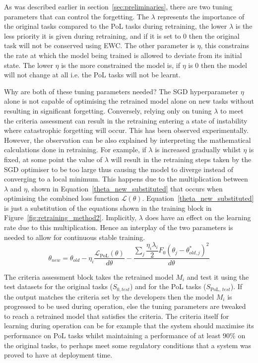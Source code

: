 As was described earlier in section~\ref{sec:preliminaries}, there are two tuning parameters that can control the forgetting. 
%
The $\lambda$ represents the importance of the original tasks compared to the PoL tasks during retraining, the lower $\lambda$ is the less priority it is given during retraining, and if it is set to 0 then the original task will not be conserved using EWC. 
%
The other parameter is $\eta$, this constrains the rate at which the model being trained is allowed to deviate from its initial state. 
%
The lower $\eta$ is the more constrained the model is, if $\eta$ is 0 then the model will not change at all i.e. the PoL tasks will not be learnt.

Why are both of these tuning parameters needed? 
%
The SGD hyperparameter $\eta$ alone is not capable of optimising the retrained model alone on new tasks without resulting in significant forgetting. 
%
Conversely, relying only on tuning $\lambda$ to meet the criteria assessment can result in the retraining entering a state of instability where catastrophic forgetting will occur. 
%
This has been observed experimentally. However, the observation can be also explained by interpreting the mathematical calculations done in retraining. 
%
For example, if $\lambda$ is increased gradually whilst $\eta$ is fixed, at some point the value of $\lambda$ will result in the retraining steps taken by the SGD optimiser to be too large thus causing the model to diverge instead of converging to a local minimum. 
%
This happens due to the multiplication between $\lambda$ and $\eta$, shown in Equation~\ref{theta_new_substituted} that occurs when optimising the combined loss function $\mathcal{L}(\theta)$.
%
Equation~\ref{theta_new_substituted} is just a substitution of the equations shown in the training block in Figure~\ref{fig:retraining_method2}. 
%
Implicitly, $\lambda$ does have an effect on the learning rate due to this multiplication.
Hence an interplay of the two parameters is needed to allow for continuous stable training. 
\begin{equation}
   \theta_{new} = \theta_{old} - \eta_{i}\dfrac{\mathcal{L}_{\text{PoL}}(\theta)}{d\theta} - 
   \dfrac{\sum_{j}^{}\dfrac{\eta_i\lambda_i}{2} F_0(\theta_j - \theta^{*}_{old,j})^2}{d\theta}
   \label{theta_new_substituted}
\end{equation}

The criteria assessment block takes the retrained model $M_i$ and test it using the test datasets for the original tasks ($S_{0,test}$) and for the PoL tasks ($S_{\text{PoL, }test}$).
%
If the output matches the criteria set by the developers then the model $M_i$ is progressed to be used during operation, else the tuning parameters are tweaked to reach a retrained model that satisfies the criteria.
%
The criteria itself for learning during operation can be for example that the system should maximise its performance on PoL tasks whilst maintaining a performance of at least $90\%$ on the original tasks, to perhaps meet some regulatory conditions that a system was proved to have at deployment time. 



